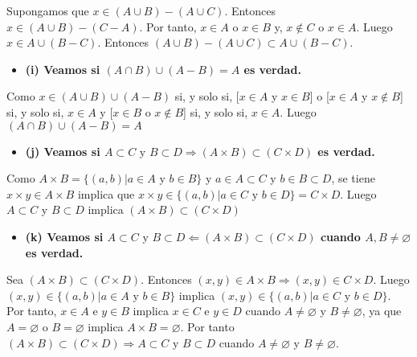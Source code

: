 \documentclass{article}
\begin{document}
Supongamos que $x\in (A\cup B)-(A\cup C)$. Entonces $x\in (A\cup B)-(C-A)$. Por tanto, $x\in A$ o $x\in B$ y, $x\notin C$ o $x\in A$. Luego $x\in A\cup (B-C)$. Entonces $(A\cup B)-(A\cup C)\subset A\cup (B-C)$.
\begin{itemize}
\item \bf (i) \rm Veamos si  $(A\cap B)\cup(A-B)=A$ es verdad.
\end{itemize}
Como $x\in (A\cup B)\cup (A-B)$ si, y solo si, [$x\in A$ y $x\in B$] o [$x\in A $ y $x\notin B$] si, y solo si, $x\in A$ y [$x\in B$ o $x\notin B$] si, y solo si, $x\in A$. Luego $(A\cap B)\cup(A-B)=A$
\begin{itemize}
\item \bf (j) \rm Veamos si  $A\subset C\text{ y }B\subset D \Rightarrow( A\times B)\subset(C\times  D)$ es verdad.
\end{itemize}
Como $A\times B=\{(a,b)|a\in A\text{ y } b\in B\}$ y $a\in A\subset C$ y $b\in B\subset D$, se tiene $x\times y\in A\times B$ implica que $x\times y\in\{(a,b)|a\in C\text{ y } b\in D\}=C\times D$. Luego $A\subset C$ y $B\subset D$ implica $( A\times B)\subset(C\times  D)$
\begin{itemize}
\item \bf (k) \rm Veamos si  $A\subset C\text{ y }B\subset D \Leftarrow( A\times B)\subset(C\times  D)$ cuando $A,B\neq \varnothing$ es verdad.
\end{itemize}
Sea $( A\times B)\subset(C\times  D)$. Entonces $(x,y)\in A\times B\Rightarrow (x,y)\in C\times D$. Luego $(x,y)\in\{(a,b)|a\in A\text{ y } b\in B\}$ implica $(x,y)\in\{(a,b)|a\in C\text{ y } b\in D\}$. Por tanto, $x\in A$ e $y\in B$ implica $x\in C$ e $y\in D$ cuando $A\neq \varnothing $ y $B\neq \varnothing$, ya que $A= \varnothing $ o $B= \varnothing$ implica $A\times B=\varnothing$. Por tanto $( A\times B)\subset(C\times  D)\Rightarrow A\subset C \text{ y }B\subset D$ cuando $A\neq \varnothing $ y $B\neq \varnothing$.
\end{document}
